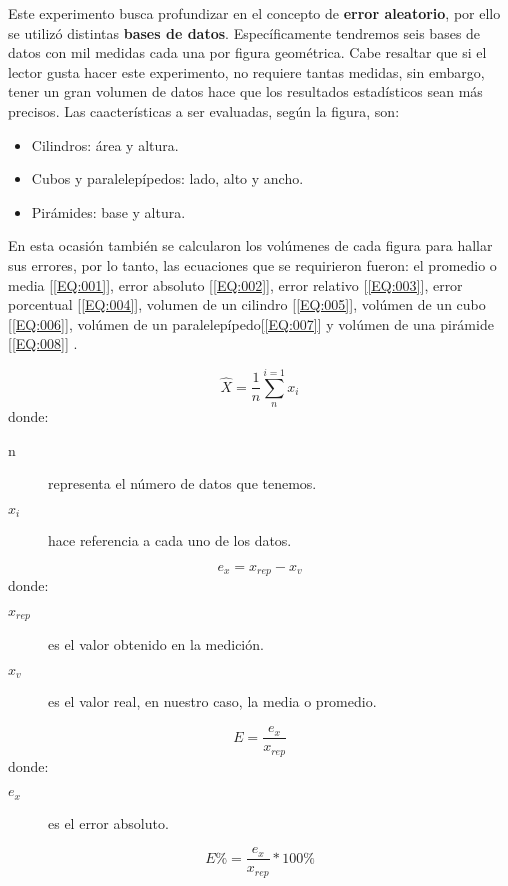 \documentclass[%
 reprint,
groupedaddress,
unsortedaddress,
 amsmath,amssymb,
 aps,
superscriptaddress
]{revtex4-2}
\begin{document}
Este experimento busca profundizar en el concepto de \textbf{error aleatorio}, por ello se utilizó distintas \textbf{bases de datos}. Específicamente tendremos seis bases de datos con mil medidas cada una por figura geométrica. Cabe resaltar que si el lector gusta hacer este experimento, no requiere tantas medidas, sin embargo, tener un gran volumen de datos hace que los resultados estadísticos sean más precisos. Las caacterísticas a ser evaluadas, según la figura, son:
\begin{itemize}
	\item Cilindros: área y altura.
	\item Cubos y paralelepípedos: lado, alto y ancho.
	\item Pirámides: base y altura.

\end{itemize}
En esta ocasión también se calcularon los volúmenes de cada figura para hallar sus errores, por lo tanto, las ecuaciones que se requirieron fueron: el promedio o media [\ref{EQ:001}], error absoluto [\ref{EQ:002}], error relativo [\ref{EQ:003}], error porcentual [\ref{EQ:004}], volumen de un cilindro [\ref{EQ:005}], volúmen de un cubo [\ref{EQ:006}], volúmen de un paralelepípedo[\ref{EQ:007}] y volúmen de una pirámide [\ref{EQ:008}] .
 
 

\begin{equation}\label{EQ:001}
	\hat X = \frac{1}{n} \sum_{n}^{i=1} x_i
\end{equation}
donde:
\begin{description}
	\item[n] representa el número de datos que tenemos.
	\item[$x_i$] hace referencia a cada uno de los datos.
\end{description}
\begin{equation}\label{EQ:002}
	e_x = x_{rep} - x_v
\end{equation}
donde:
\begin{description}
	\item[$x_{rep}$] es el valor obtenido en la medición.
	\item[$x_{v}$] es el valor real, en nuestro caso, la media o promedio.
\end{description}
\begin{equation}\label{EQ:003}
	E = \frac{e_x}{x_{rep}}
\end{equation}
donde:
\begin{description}
	\item[$e_x$] es el error absoluto.
\end{description}
\begin{equation}\label{EQ:004}
	E\% = \frac{e_x}{x_{rep}} * 100\%
\end{equation}
\end{document}
